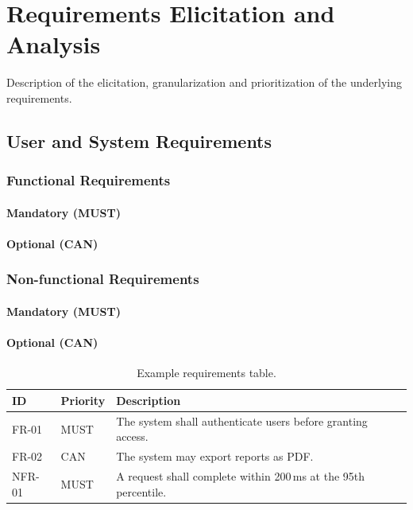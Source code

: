 \chapter{Requirements Elicitation and Analysis}
\label{ch:requirements}

Description of the elicitation, granularization and prioritization of the
underlying requirements.

\section{User and System Requirements}

\subsection{Functional Requirements}
\subsubsection{Mandatory (MUST)}
\subsubsection{Optional (CAN)}

\subsection{Non-functional Requirements}
\subsubsection{Mandatory (MUST)}
\subsubsection{Optional (CAN)}

\begin{table}[H]
\centering
\caption{Example requirements table.}
\label{tab:requirements}
\begin{tabular}{@{}llp{6cm}@{}}
\toprule
\textbf{ID} & \textbf{Priority} & \textbf{Description} \\
\midrule
FR-01 & MUST & The system shall authenticate users before granting access. \\
FR-02 & CAN  & The system may export reports as PDF. \\
NFR-01 & MUST & A request shall complete within 200\,ms at the 95th percentile. \\
\bottomrule
\end{tabular}
\end{table}
